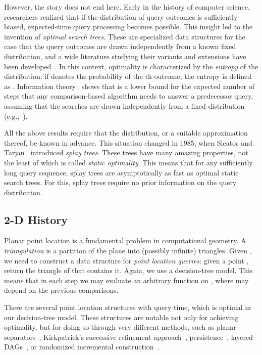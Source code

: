 \documentclass[11pt]{article}
\begin{document}
However, the story does not end here. Early in the history of computer 
science, researchers realized that if the distribution of query outcomes
is sufficiently biased,   expected-time query processing 
becomes possible. 
This insight led to the invention of \emph{optimal search trees}.
These are specialized data structures for the case
that the query outcomes are drawn independently from a known
fixed distribution, and a wide literature studying their variants 
and extensions have been
developed~\cite{optimum1,optimum2,optimum3,optimum4,optimum5,optimum6, optimum7,
optimum8, optimum9, optimum10, optimum11, optimum12, optimum13, optimum14,
optimum15}.  In this context, optimality is characterized by the \emph{entropy} 
of the distribution: if  denotes the probability of the th outcome, 
the entropy  is defined as 
. Information theory~\cite{weaver} 
shows that   
is a lower bound for the expected number of steps that any 
comparison-based algorithm needs to answer a predecessor query,
assuming that the searches are drawn independently from a 
fixed distribution (e.g.,~\cite[Claim~2.2]{AilonChClLiMuSe11}).

All the above results require that the distribution, or a suitable
approximation thereof, be known in advance. This situation changed in 
1985, when Sleator and Tarjan~\cite{splay} introduced \emph{splay trees}. 
These trees have
many amazing properties, not the least of which is 
called \emph{static optimality}. This means that for any
sufficiently long query sequence, splay trees are
asymptotically as fast as optimal static search trees. For this, splay trees 
require no prior information on the query distribution.


\subsection{2-D History}

Planar point location is a fundamental problem in computational
geometry. A \emph{triangulation}  is a partition of the plane into
(possibly infinite) triangles. Given , 
we need to construct a data structure for \emph{point location queries}: 
given a point , return the triangle of  that contains it.
Again, we use a decision-tree model. This means that in each step we may
evaluate an arbitrary function 
  on , where  may depend on 
the previous comparisons.

There are several point location structures with  query time, which
is optimal in our decision-tree model.
These structures are notable not only for achieving optimality,
but for doing so through very different methods,
such as planar separators~\cite{LiptonTa80,LiptonTa79}, Kirkpatrick's 
successive refinement approach~\cite{kirk}, persistence~\cite{ppl5},
layered DAGs~\cite{EdelsbrunnerGuSt86},
or randomized incremental construction~\cite{trapseidel,Mulmuley90}.
\end{document}
